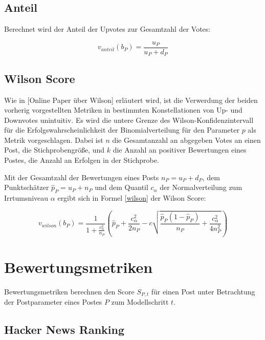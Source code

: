 \subsection{Anteil}

Berechnet wird der Anteil der Upvotes zur Gesamtzahl der Votes:

\begin{equation}
\label{anteil}
v_{anteil}(b_P) = \frac{u_P}{u_P + d_P}
\end{equation}


\subsection{Wilson Score}

Wie in [Online Paper über Wilson] erläutert wird, ist die Verwerdung der beiden vorherig vorgestellten Metriken in bestimmten Konstellationen von Up- und Downvotes unintuitiv. Es wird  die untere Grenze des Wilson-Konfidenzintervall für die Erfolgswahrscheinlichkeit der Binomialverteilung für den Parameter $p$ als Metrik vorgeschlagen. Dabei ist $n$ die Gesamtanzahl an abgegeben Votes an einen Post, die Stichprobengröße, und $k$ die Anzahl an positiver Bewertungen eines Postes, die Anzahl an Erfolgen in der Stichprobe.
	
Mit der Gesamtzahl der Bewertungen eines Posts $n_P = u_P + d_P$, dem Punktschätzer $\hat{p}_P = u_P + n_P$ und dem Quantil $c_{\alpha}$ der Normalverteilung zum Irrtumsniveau $\alpha$ ergibt sich in Formel \ref{wilson} der Wilson Score:

\begin{equation}
\label{wilson}
 v_{wilson}(b_P) = \frac{1}{1+\frac{c_{\alpha}^2}{n_P}}(\hat{p}_P + \frac{c_{\alpha}^2}{2n_P} - c \sqrt{\frac{\hat{p}_P(1 - \hat{p}_P)}{n_P} + \frac{c_{\alpha}^2}{4n_P^2}})
\end{equation}
	
\section{Bewertungsmetriken}

Bewertungsmetriken berechnen den Score $S_{P,t}$ für einen Post unter Betrachtung der Postparameter eines Postes $P$ zum Modellschritt $t$.
	
\subsection{Hacker News Ranking}
\label{seqHackerNews}


